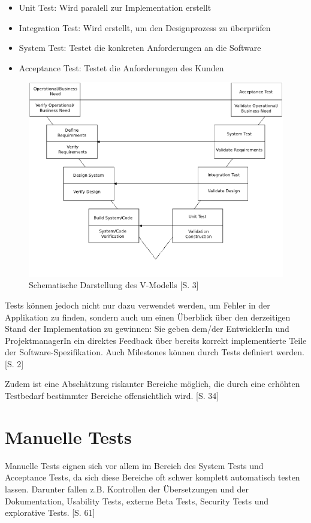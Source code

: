 \documentclass[a4paper,bibtotoc,oneside]{scrbook}
\begin{document}
\begin{itemize}
	\item Unit Test: Wird paralell zur Implementation erstellt
	\item Integration Test: Wird erstellt, um den Designprozess zu überprüfen
	\item System Test: Testet die konkreten Anforderungen an die Software
	\item Acceptance Test: Testet die Anforderungen des Kunden
\end{itemize}

\begin{figure}[h!]
\centering
\includegraphics[width=120mm]{img/vmodel.png}
\caption[Schematische Darstellung des V-Modells]{Schematische Darstellung des V-Modells \cite{vmodel}[S. 3]}\label{Abb3}
\end{figure}

Tests können jedoch nicht nur dazu verwendet werden, um Fehler in der Applikation zu finden, sondern auch um einen Überblick über den derzeitigen Stand der Implementation zu gewinnen: Sie geben dem/der EntwicklerIn und ProjektmanagerIn ein direktes Feedback über bereits korrekt implementierte Teile der Software-Spezifikation. Auch Milestones können durch Tests definiert werden. \cite{test_auto}[S. 2]

Zudem ist eine Abschätzung riskanter Bereiche möglich, die durch eine erhöhten Testbedarf bestimmter Bereiche offensichtlich wird. \cite{testing_apps_on_web}[S. 34]


\section{Manuelle Tests}
Manuelle Tests eignen sich vor allem im Bereich des System Tests und Acceptance Tests, da sich diese Bereiche oft schwer komplett automatisch testen lassen. Darunter fallen z.B. Kontrollen der Übersetzungen und der Dokumentation, Usability Tests, externe Beta Tests, Security Tests und explorative Tests. \cite{test_large_systems}[S. 61]
\end{document}
